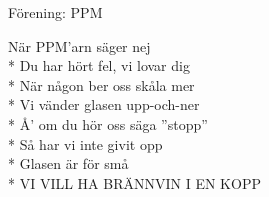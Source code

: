 \begin{SongText}
    \begin{SongInfo}
        Förening: PPM
    \end{SongInfo}
    \begin{SongVerse}
        När PPM’arn säger nej\\*%
        Du har hört fel, vi lovar dig\\*%
        När någon ber oss skåla mer\\*%
        Vi vänder glasen upp-och-ner\\*%
        Å’ om du hör oss säga ”stopp”\\*%
        Så har vi inte givit opp\\*%
        Glasen är för små\\*%
        VI VILL HA BRÄNNVIN I EN KOPP
    \end{SongVerse}
\end{SongText}
